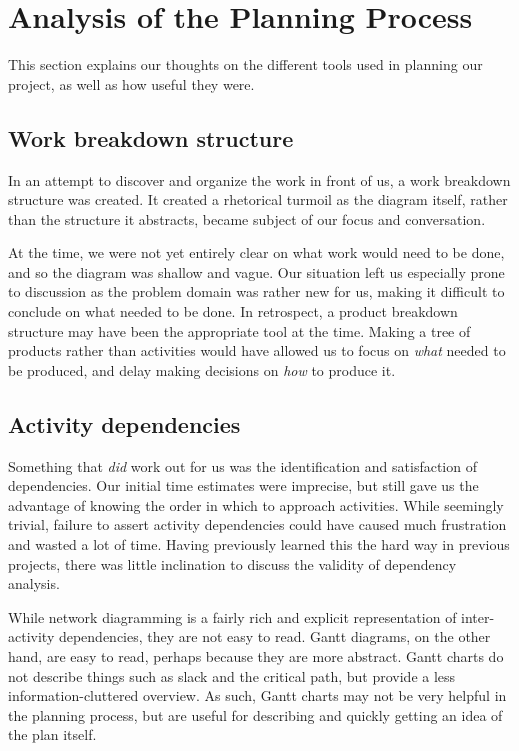 \section{Analysis of the Planning Process}
\label{sec:AnalysisPlanning}

This section explains our thoughts on the different tools used in planning our
project, as well as how useful they were.

\subsection{Work breakdown structure} In an attempt to discover and organize
the work in front of us, a work breakdown structure was created. It created a
rhetorical turmoil as the diagram itself, rather than the structure it
abstracts, became subject of our focus and conversation.

At the time, we were not yet entirely clear on what work would need to be done,
and so the diagram was shallow and vague. Our situation left us especially
prone to discussion as the problem domain was rather new for us, making it
difficult to conclude on what needed to be done. In retrospect, a product
breakdown structure may have been the appropriate tool at the time. Making a
tree of products rather than activities would have allowed us to focus on
\emph{what} needed to be produced, and delay making decisions on \emph{how} to
produce it\cite[ch.~8.3,~8.4]{caye}.

\subsection{Activity dependencies}
Something that \emph{did} work out for us was the identification and
satisfaction of dependencies. Our initial time estimates were imprecise, but
still gave us the advantage of knowing the order in which to approach
activities. While seemingly trivial, failure to assert activity dependencies
could have caused much frustration and wasted a lot of time. Having previously
learned this the hard way in previous projects, there was little inclination to
discuss the validity of dependency analysis.

While network diagramming is a fairly rich and explicit representation of
inter-activity dependencies, they are not easy to read. Gantt
diagrams, on the other hand, are easy to read, perhaps because they are more
abstract. Gantt charts do not describe things such as slack and the critical
path, but provide a less information-cluttered overview. As such, Gantt charts
may not be very helpful in the planning process, but are useful for describing
and quickly getting an idea of the plan itself.

